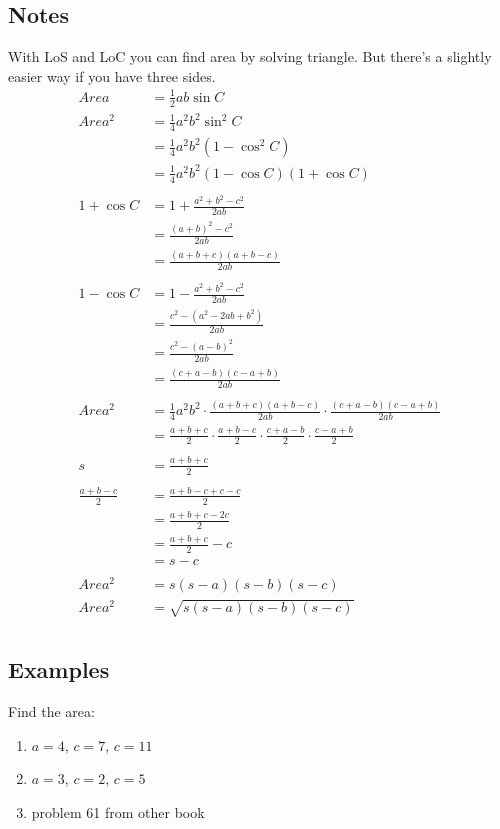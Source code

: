 \documentclass{exam}
\begin{document}
  \subsection{Notes}
  With LoS and LoC you can find area by solving triangle.  But there's a slightly easier way if you have three sides.
  \begin{align*}
    Area   & = \frac{1}{2} a b \sin C \\
    Area^2 & = \frac{1}{4} a^2 b^2 \sin^2 C \\
           & = \frac{1}{4} a^2 b^2 \left( 1 - \cos^2 C \right) \\
           & = \frac{1}{4} a^2 b^2 ( 1 - \cos C )( 1 + \cos C ) \\
    \\
    1 + \cos C & = 1 + \frac{a^2 + b^2 - c^2}{2ab} \\
               & = \frac{(a + b)^2 - c^2}{2ab} \\
               & = \frac{(a + b + c)(a + b - c)}{2ab} \\
    \\
    1 - \cos C & = 1 - \frac{a^2 + b^2 - c^2}{2ab} \\
               & = \frac{c^2 - (a^2 - 2ab + b^2)}{2ab} \\
               & = \frac{c^2 - (a - b)^2 }{2ab} \\
               & = \frac{(c + a - b)(c - a + b)}{2ab} \\
    \\
    Area^2 & = \frac{1}{4} a^2 b^2 \cdot \frac{(a + b + c)(a + b - c)}{2ab} \cdot \frac{(c + a - b)(c - a + b)}{2ab} \\
           & = \frac{a + b + c}{2} \cdot \frac{a + b - c}{2} \cdot \frac{c + a - b}{2} \cdot \frac{c - a + b}{2} \\
    \\
    s & = \frac{a + b + c}{2} \\
    \\
    \frac{a + b - c}{2} & = \frac{a + b - c + c - c}{2} \\
                        & = \frac{a + b + c - 2c}{2} \\
                        & = \frac{a + b + c}{2} - c \\
                        & = s - c \\
    \\
    Area^2 & = s (s - a)(s - b)(s - c) \\
    Area^2 & = \sqrt{s (s - a)(s - b)(s - c)} \\
  \end{align*}

  \subsection{Examples}
  
  Find the area:
  \begin{enumerate}
    \item $a = 4$, $c = 7$, $c = 11$
    \item $a = 3$, $c = 2$, $c = 5$

    \item problem 61 from other book
  \end{enumerate}
\end{document}
